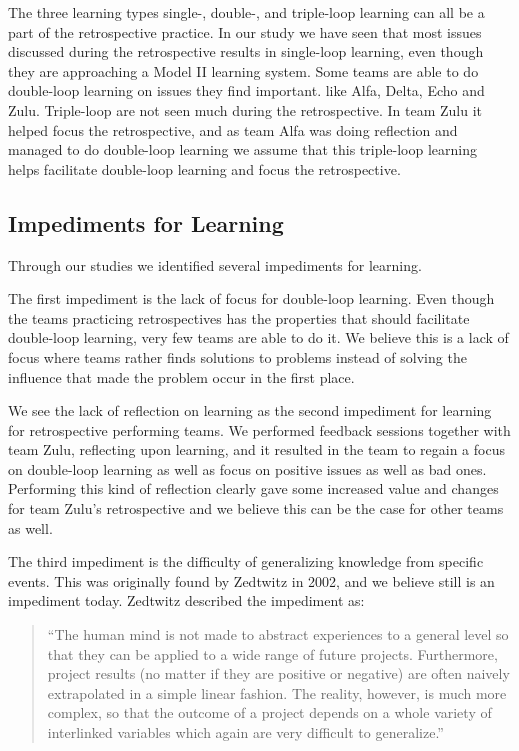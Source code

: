 The three learning types single-, double-, and triple-loop learning can all be a part of the retrospective practice. In our study we have seen that most issues discussed during the retrospective results in single-loop learning, even though they are approaching a Model II learning system. Some teams are able to do double-loop learning on issues they find important. like Alfa, Delta, Echo and Zulu. Triple-loop are not seen much during the retrospective. In team Zulu it helped focus the retrospective, and as team Alfa was doing reflection and managed to do double-loop learning we assume that this triple-loop learning helps facilitate double-loop learning and focus the retrospective. 

\subsection{Impediments for Learning}
\label{discussion:learning-impediments}
Through our studies we identified several impediments for learning. 

The first impediment is the lack of focus for double-loop learning. Even though the teams practicing retrospectives has the properties that should facilitate double-loop learning, very few teams are able to do it. We believe this is a lack of focus where teams rather finds solutions to problems instead of solving the influence that made the problem occur in the first place.

We see the lack of reflection on learning as the second impediment for learning for retrospective performing teams. We performed feedback sessions together with team Zulu, reflecting upon learning, and it resulted in the team to regain a focus on double-loop learning as well as focus on positive issues as well as bad ones. Performing this kind of reflection clearly gave some increased value and changes for team Zulu's retrospective and we believe this can be the case for other teams as well. 

The third impediment is the difficulty of generalizing knowledge from specific events. This was originally found by Zedtwitz \cite{Zedtwitz2002} in 2002, and we believe still is an impediment today. Zedtwitz described the impediment as: 

\begin{quote}
``The human mind is not made to abstract experiences to a general level so that they can be applied to a wide range of future projects. Furthermore, project results (no matter if they are positive or negative) are often naively extrapolated in a simple linear fashion. The reality, however, is much more complex, so that the outcome of a project depends on a whole variety of interlinked variables which again are very difficult to generalize.''
\end{quote}

